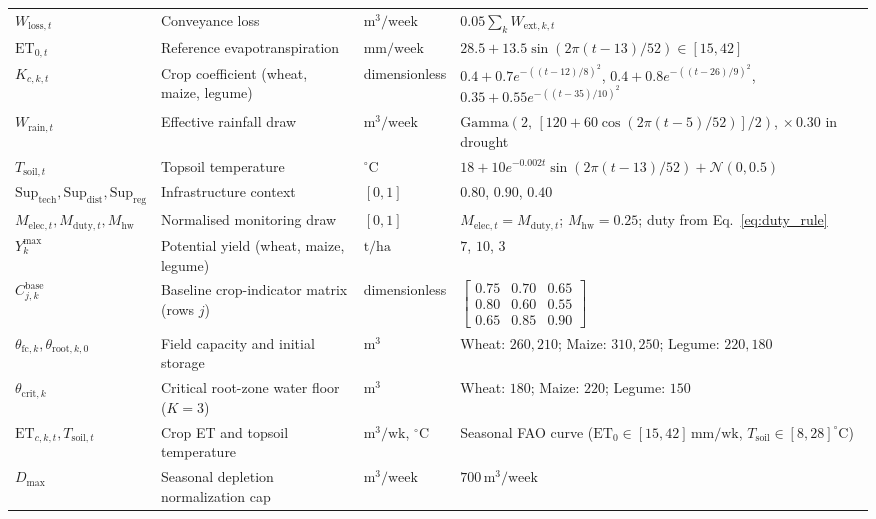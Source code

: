\documentclass[11pt,a4paper]{article}
\begin{document}
\begin{table}[t]
{\begin{tabular}{@{}llll@{}}
    $W_{\mathrm{loss},t}$ & Conveyance loss & $\mathrm{m}^3/\text{week}$ & $0.05\sum_k W_{\mathrm{ext},k,t}$ \\
    $\mathrm{ET}_{0,t}$ & Reference evapotranspiration & $\mathrm{mm}/\text{week}$ & $28.5 + 13.5\sin(2\pi(t-13)/52) \in [15,42]$ \\
    $K_{c,k,t}$ & Crop coefficient (wheat, maize, legume) & dimensionless & $0.4+0.7e^{-((t-12)/8)^2}$, $0.4+0.8e^{-((t-26)/9)^2}$, $0.35+0.55e^{-((t-35)/10)^2}$ \\
    $W_{\mathrm{rain},t}$ & Effective rainfall draw & $\mathrm{m}^3/\text{week}$ & $\mathrm{Gamma}(2,\,[120+60\cos(2\pi(t-5)/52)]/2)$, $\times\,0.30$ in drought \\
    $T_{\mathrm{soil},t}$ & Topsoil temperature & $^\circ\mathrm{C}$ & $18 + 10e^{-0.002t}\sin(2\pi(t-13)/52) + \mathcal{N}(0,0.5)$ \\
    $\mathrm{Sup}_{\mathrm{tech}}, \mathrm{Sup}_{\mathrm{dist}}, \mathrm{Sup}_{\mathrm{reg}}$ & Infrastructure context & $[0,1]$ & $0.80$, $0.90$, $0.40$ \\
    $M_{\mathrm{elec},t}, M_{\mathrm{duty},t}, M_{\mathrm{hw}}$ & Normalised monitoring draw & $[0,1]$ & $M_{\mathrm{elec},t}=M_{\mathrm{duty},t}$; $M_{\mathrm{hw}}=0.25$; duty from Eq.~\eqref{eq:duty_rule} \\
    $Y^{\max}_k$ & Potential yield (wheat, maize, legume) & $\mathrm{t}/\mathrm{ha}$ & $7$, $10$, $3$ \\
    $C^{\mathrm{base}}_{j,k}$ & Baseline crop-indicator matrix (rows $j$) & dimensionless & $\left[\begin{smallmatrix}0.75&0.70&0.65\\0.80&0.60&0.55\\0.65&0.85&0.90\end{smallmatrix}\right]$ \\
    $\theta_{\mathrm{fc},k}, \theta_{\mathrm{root},k,0}$ & Field capacity and initial storage & $\mathrm{m}^3$ & Wheat: $260, 210$; Maize: $310, 250$; Legume: $220, 180$ \\
    $\theta_{\mathrm{crit},k}$ & Critical root-zone water floor ($K=3$) & $\mathrm{m}^3$ & Wheat: $180$; Maize: $220$; Legume: $150$ \\
    $\mathrm{ET}_{c,k,t}, T_{\mathrm{soil},t}$ & Crop ET and topsoil temperature & $\mathrm{m}^3/\text{wk}$, $^{\circ}\mathrm{C}$ & Seasonal FAO curve ($\mathrm{ET}_0 \in [15,42]\,\mathrm{mm/wk}$, $T_{\mathrm{soil}} \in [8,28]^{\circ}\mathrm{C}$) \\
    $D_{\max}$ & Seasonal depletion normalization cap & $\mathrm{m}^3/\text{week}$ & $700\,\mathrm{m}^3/\text{week}$ \\

\end{tabular}}
\end{table}
\end{document}
